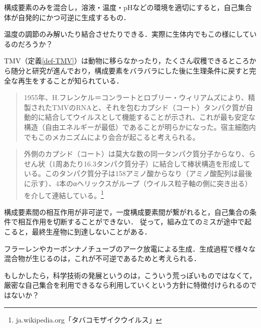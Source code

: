 \documentclass[uplatex, dvipdfmx]{jsreport}
\begin{document}
\begin{definition}
    構成要素のみを混合し，溶液・温度・pHなどの環境を適切にすると，自己集合体が自発的にかつ可逆に生成するもの．
\end{definition}
\begin{example}[DNAの二重螺旋]
    温度の調節のみ解いたり結合させたりできる．実際に生体内でもこの様にしているのだろうか？
\end{example}
\begin{example}
    TMV（定義\ref{def-TMV}）は動物に移らなかったり，たくさん収穫できるところから随分と研究が進んでおり，構成要素をバラバラにした後に生理条件に戻すと完全な再生をすることが知られている．
    \begin{quote}
        1955年、H.フレンケル＝コンラートとロブリー・ウィリアムズにより、精製されたTMVのRNAと、それを包むカプシド（コート）タンパク質が自動的に結合してウイルスとして機能することが示され、これが最も安定な構造（自由エネルギーが最低）であることが明らかになった。宿主細胞内でもこのメカニズムにより会合が起こると考えられる。
    \end{quote}
    \begin{quote}
        外側のカプシド（コート）は莫大な数の同一タンパク質分子からなり、らせん状（1周あたり16.3タンパク質分子）に結合して棒状構造を形成している。このタンパク質分子は158アミノ酸からなり（アミノ酸配列は最後に示す）、4本のαヘリックスがループ（ウイルス粒子軸の側に突き出る）を介して連結している。\footnote{ja.wikipedia.org「タバコモザイクウイルス」}
    \end{quote}
\end{example}

\begin{definition}
    構成要素間の相互作用が非可逆で，一度構成要素間が繋がれると，自己集合の条件で相互作用を切断することができない．
    従って，組み立てのミスが途中で起こると，最終生産物に到達しないことがある．
\end{definition}
\begin{example}
    フラーレンやカーボンナノチューブのアーク放電による生成．生成過程で様々な混合物が生じるのは，これが不可逆であるためと考えられる．

    もしかしたら，科学技術の発展というのは，こういう荒っぽいものではなくて，厳密な自己集合を利用できるなら利用していくという方針に特徴付けられるのではないか？
\end{example}
\end{document}
